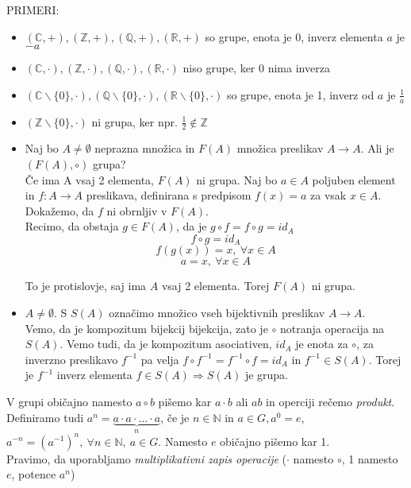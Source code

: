 \documentclass[a4paper,12pt]{article}
\begin{document}
\noindent PRIMERI: 
\begin{itemize}
\item $(\mathbb{C},+), (\mathbb{Z},+), (\mathbb{Q},+), (\mathbb{R},+)$ so grupe, enota je 0, inverz elementa $a$ je $-a$
\item $(\mathbb{C},\cdot), (\mathbb{Z},\cdot), (\mathbb{Q},\cdot), (\mathbb{R},\cdot)$ niso grupe, ker 0 nima inverza
\item $(\mathbb{C}\backslash \{ 0 \},\cdot), (\mathbb{Q}\backslash \{ 0 \},\cdot), (\mathbb{R}\backslash \{ 0 \},\cdot)$ so grupe, enota je 1, inverz od $a$ je $\frac{1}{a}$
\item $(\mathbb{Z}\backslash \{ 0 \},\cdot)$ ni grupa, ker npr. $\frac{1}{2} \notin \mathbb{Z}$
\item Naj bo $A\neq \emptyset$ neprazna množica in $F(A)$ množica preslikav $A\to A$. Ali je $(F(A),\circ)$ grupa? \\

Če ima A vsaj 2 elementa, $F(A)$ ni grupa. Naj bo $a\in A$ poljuben element in $f: A\to A$ preslikava, definirana s predpisom $f(x)=a$ za vsak $x\in A$. Dokažemo, da $f$ ni obrnljiv v $F(A)$.\\

Recimo, da obstaja $g\in F(A)$, da je $g\circ f=f \circ g=id_A$
$$f\circ g=id_A$$
$$f(g(x))=x,~\forall x \in A$$
$$ a=x,~\forall x\in A$$

To je protislovje, saj ima $A$ vsaj 2 elementa. Torej $F(A)$ ni grupa.

\item $A\neq \emptyset$. S $S(A)$ označimo množico vseh bijektivnih preslikav $A\to A$. \\

Vemo, da je kompozitum bijekcij bijekcija, zato je $\circ$ notranja operacija na $S(A)$. Vemo tudi, da je kompozitum asociativen, $id_A$ je enota za $\circ$, za inverzno preslikavo $f^{-1}$ pa velja $f\circ f^{-1}=f^{-1}\circ f=id_A$ in $f^{-1}\in S(A)$. Torej je $f^{-1}$ inverz elementa $f\in S(A) \Rightarrow S(A)$ je grupa.
\end{itemize}

\noindent V grupi običajno namesto $a\circ b$ pišemo kar $a\cdot b$ ali $ab$ in operciji rečemo \textit{produkt}. Definiramo tudi $a^n=\underbrace{a\cdot a \cdot \ldots \cdot a}_{n}$, če je $n\in \mathbb{N}$ in $a\in G,a^0=e$, $a^{-n}=(a^{-1})^n,~\forall n\in \mathbb{N},~a\in G$. Namesto $e$ običajno pišemo kar 1. \\

\noindent Pravimo, da uporabljamo \textit{multiplikativni zapis operacije} ($\cdot$ namesto $\circ$, 1 namesto $e$, potence $a^n$) \\
\end{document}
